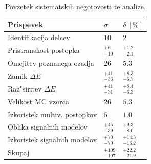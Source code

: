 \begin{otherlanguage}{slovene}
\begin{table}[H]
	\centering
	\begin{tabular}{l|l|l}
		Prispevek & $\sigma$ & $\delta~[\%]$ \\
		\toprule
		Identifikacija delcev & $10$ & $2$ \\
		Pristranskost postopka & $ {}^{+6}_{-10}$ & ${}^{+1.2}_{-2.1}$ \\
		Omejitev poznanega ozadja & $26$ & $5.3$ \\
		Zamik $\Delta E$ & ${}^{+41}_{-33}$ & ${}^{+8.3}_{-6.7}$ \\
		Raz"siritev $\Delta E$ & ${}^{+41}_{-31}$ & ${}^{+8.4}_{-6.3}$ \\
		Velikost MC vzorca & $26$ & $5.3$ \\
		Izkoristek multiv. postopkov & $5$ & $1.0$\\
		Oblika signalnih modelov & ${}^{+45}_{-39}$ & ${}^{+9.3}_{-8.0}$ \\
		Izkoristek signalnih modelov & ${}^{+70}_{-79}$ & ${}^{+14.3}_{-16.2}$ \\
		\midrule
		Skupaj & ${} ^{+109}_{-107}$ & ${}^{+22.2}_{-21.9}$ \\
		\bottomrule
	\end{tabular}
	\captionsetup{width=0.8\linewidth}
	\caption{Povzetek sistematskih negotovosti te analize.}
	\label{tab:sys_summary_si}
\end{table}

\end{otherlanguage}
